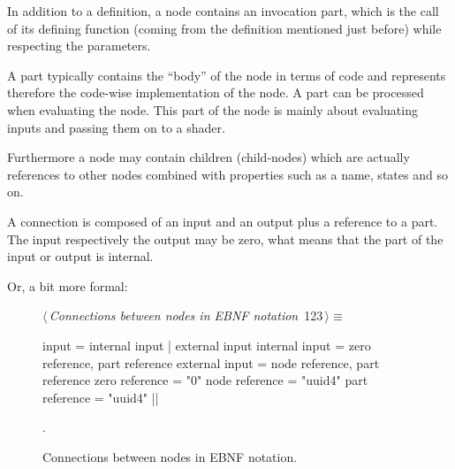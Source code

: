 \documentclass[%
    a4paper,    %
    justified,  %
    nobib,      %
    openany     %
]{tufte-book}
\makeatletter
\renewcommand{\label}[1]{\@tufte@label{##1}}%
\makeatother
\begin{document}
In addition to a definition, a node contains an invocation part, which is the
call of its defining function (coming from the definition mentioned just
before) while respecting the parameters.

 A part typically
contains the \enquote{body} of the node in terms of code and represents
therefore the code-wise implementation of the node. A part can be processed when
evaluating the node. This part of the node is mainly about evaluating inputs and
passing them on to a shader.

Furthermore a node may contain children (child-nodes) which are actually
references to other nodes combined with properties such as a name, states and so
on.

 A connection is composed
of an input and an output plus a reference to a part. The input respectively the
output may be zero, what means that the part of the input or output is internal.

Or, a bit more formal:

\begin{figure}[!htbp]
\begin{flushleft} \small
\begin{minipage}{\linewidth}\label{scrap61}\raggedright\small
{} $\langle\,${\itshape Connections between nodes in EBNF notation}\nobreak\ {\footnotesize {123}}$\,\rangle\equiv$
\vspace{-1ex}
\begin{pythoncode}
input = internal input | external input
internal input = zero reference, part reference
external input = node reference, part reference
zero reference = "0"
node reference = "uuid4"
part reference = "uuid4"
|\NWsep|
\end{pythoncode}
\vspace{1.5ex}
\footnotesize
\begin{list}{}{\setlength{\itemsep}{-\parsep}\setlength{\itemindent}{-\leftmargin}}
\item {\NWtxtMacroNoRef}.

\item{}
\end{list}
\end{minipage}\vspace{4ex}
\end{flushleft}
\caption{Connections between nodes in EBNF notation.}
\end{figure}
\end{document}

